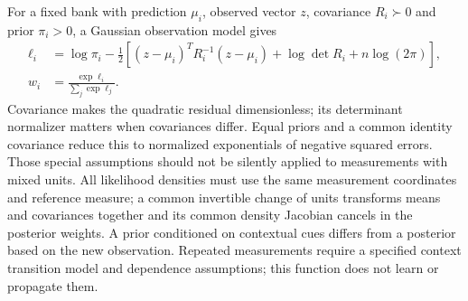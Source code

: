 For a fixed bank with prediction $\mu_i$, observed vector $z$, covariance
$R_i\succ0$ and prior $\pi_i>0$, a Gaussian observation model gives
\begin{align}
 \ell_i&=\log\pi_i-\tfrac12\left[
 (z-\mu_i)^TR_i^{-1}(z-\mu_i)+\log\det R_i+n\log(2\pi)\right],\\
 w_i&=\frac{\exp\ell_i}{\sum_j\exp\ell_j}.
\end{align}
Covariance makes the quadratic residual dimensionless; its determinant
normalizer matters when covariances differ. Equal priors and a common identity
covariance reduce this to normalized exponentials of negative squared errors.
Those special assumptions should not be silently applied to measurements
with mixed units. All likelihood densities must use the
same measurement coordinates and reference measure; a common invertible
change of units transforms means and covariances together and its common
density Jacobian cancels in the posterior weights. A prior conditioned on
contextual cues differs from a posterior based on the new observation.
Repeated measurements require a
specified context transition model and dependence assumptions; this function
does not learn or propagate them.

